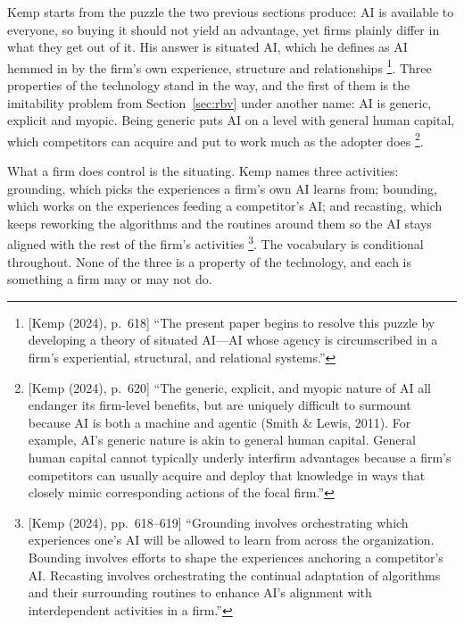Kemp starts from the puzzle the two previous sections produce: AI is available to
everyone, so buying it should not yield an advantage, yet firms plainly differ in what
they get out of it. His answer is situated AI, which he defines as AI hemmed in by the
firm's own experience, structure and
relationships \parencite[p.~618]{kemp2024competitive}\footnote{[Kemp (2024), p.~618]
``The present paper begins to resolve this puzzle by developing a theory of situated
AI---AI whose agency is circumscribed in a firm's experiential, structural, and
relational systems.''}. Three properties of the technology stand in the way, and the
first of them is the imitability problem from Section~\ref{sec:rbv} under another name:
AI is generic, explicit and myopic. Being generic puts AI on a level with general human
capital, which competitors can acquire and put to work much as the adopter
does \parencite[p.~620]{kemp2024competitive}\footnote{[Kemp (2024), p.~620] ``The generic,
explicit, and myopic nature of AI all endanger its firm-level benefits, but are uniquely
difficult to surmount because AI is both a machine and agentic (Smith \& Lewis, 2011).
For example, AI's generic nature is akin to general human capital. General human capital
cannot typically underly interfirm advantages because a firm's competitors can usually
acquire and deploy that knowledge in ways that closely mimic corresponding actions of the
focal firm.''}.

What a firm does control is the situating. Kemp names three activities: grounding, which
picks the experiences a firm's own AI learns from; bounding, which works on the
experiences feeding a competitor's AI; and recasting, which keeps reworking the
algorithms and the routines around them so the AI stays aligned with the rest of the
firm's activities \parencite[pp.~618--619]{kemp2024competitive}\footnote{[Kemp (2024),
pp.~618--619] ``Grounding involves orchestrating which experiences one's AI will be
allowed to learn from across the organization. Bounding involves efforts to shape the
experiences anchoring a competitor's AI. Recasting involves orchestrating the continual
adaptation of algorithms and their surrounding routines to enhance AI's alignment with
interdependent activities in a firm.''}. The vocabulary is conditional throughout. None
of the three is a property of the technology, and each is something a firm may or may not
do.

